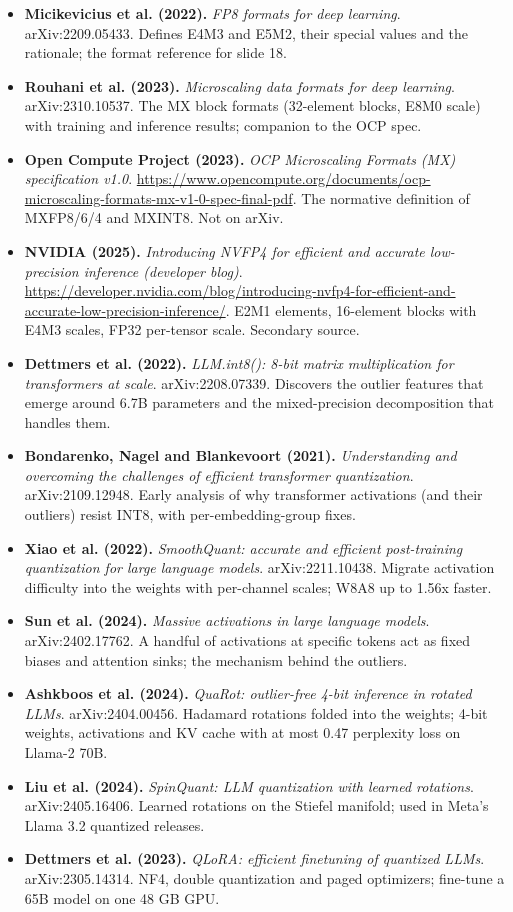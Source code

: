 \documentclass[11pt,letterpaper]{article}
\begin{document}
\begin{itemize}[leftmargin=1.2em,itemsep=3pt]\sloppy
\item \textbf{Micikevicius et al. (2022).} \textit{FP8 formats for deep learning}. arXiv:2209.05433. Defines E4M3 and E5M2, their special values and the rationale; the format reference for slide 18.
\item \textbf{Rouhani et al. (2023).} \textit{Microscaling data formats for deep learning}. arXiv:2310.10537. The MX block formats (32-element blocks, E8M0 scale) with training and inference results; companion to the OCP spec.
\item \textbf{Open Compute Project (2023).} \textit{OCP Microscaling Formats (MX) specification v1.0}. \url{https://www.opencompute.org/documents/ocp-microscaling-formats-mx-v1-0-spec-final-pdf}. The normative definition of MXFP8/6/4 and MXINT8. Not on arXiv.
\item \textbf{NVIDIA (2025).} \textit{Introducing NVFP4 for efficient and accurate low-precision inference (developer blog)}. \url{https://developer.nvidia.com/blog/introducing-nvfp4-for-efficient-and-accurate-low-precision-inference/}. E2M1 elements, 16-element blocks with E4M3 scales, FP32 per-tensor scale. Secondary source.
\item \textbf{Dettmers et al. (2022).} \textit{LLM.int8(): 8-bit matrix multiplication for transformers at scale}. arXiv:2208.07339. Discovers the outlier features that emerge around 6.7B parameters and the mixed-precision decomposition that handles them.
\item \textbf{Bondarenko, Nagel and Blankevoort (2021).} \textit{Understanding and overcoming the challenges of efficient transformer quantization}. arXiv:2109.12948. Early analysis of why transformer activations (and their outliers) resist INT8, with per-embedding-group fixes.
\item \textbf{Xiao et al. (2022).} \textit{SmoothQuant: accurate and efficient post-training quantization for large language models}. arXiv:2211.10438. Migrate activation difficulty into the weights with per-channel scales; W8A8 up to 1.56x faster.
\item \textbf{Sun et al. (2024).} \textit{Massive activations in large language models}. arXiv:2402.17762. A handful of activations at specific tokens act as fixed biases and attention sinks; the mechanism behind the outliers.
\item \textbf{Ashkboos et al. (2024).} \textit{QuaRot: outlier-free 4-bit inference in rotated LLMs}. arXiv:2404.00456. Hadamard rotations folded into the weights; 4-bit weights, activations and KV cache with at most 0.47 perplexity loss on Llama-2 70B.
\item \textbf{Liu et al. (2024).} \textit{SpinQuant: LLM quantization with learned rotations}. arXiv:2405.16406. Learned rotations on the Stiefel manifold; used in Meta's Llama 3.2 quantized releases.
\item \textbf{Dettmers et al. (2023).} \textit{QLoRA: efficient finetuning of quantized LLMs}. arXiv:2305.14314. NF4, double quantization and paged optimizers; fine-tune a 65B model on one 48 GB GPU.
\end{itemize}
\end{document}
